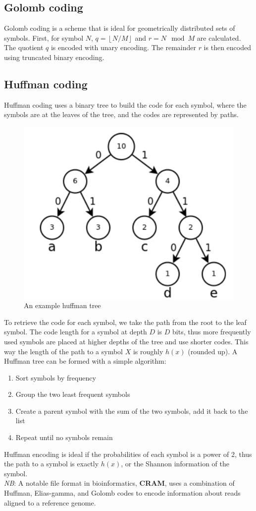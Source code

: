 \documentclass[12pt]{article}
\begin{document}
\subsection{Golomb coding}
Golomb coding is a scheme that is ideal for geometrically distributed sets of symbols. First, for symbol $N$, $q = \left \lfloor{N / M}\right \rfloor $ and $r = N \mod M$ are calculated. The quotient $q$ is encoded with unary encoding. The remainder $r$ is then encoded using truncated binary encoding.
\subsection{Huffman coding}
Huffman coding uses a binary tree to build the code for each symbol, where the symbols are at the leaves of the tree, and the codes are represented by paths.
\begin{figure}[h]
    \centering
    \includegraphics[width = .5\linewidth]{huffman.png}
    \caption{An example huffman tree}
    \label{fig:huffman}
\end{figure}
To retrieve the code for each symbol, we take the path from the root to the leaf symbol. The code length for a symbol at depth $D$ is $D$ bits, thus more frequently used symbols are placed at higher depths of the tree and use shorter codes. This way the length of the path to a symbol $X$ is roughly $h(x)$ (rounded up). A Huffman tree can be formed with a simple algorithm:
\begin{enumerate}
    \item Sort symbols by frequency
    \item Group the two least frequent symbols 
    \item Create a parent symbol with the sum of the two symbols, add it back to the list
    \item Repeat until no symbols remain
\end{enumerate}
Huffman encoding is ideal if the probabilities of each symbol is a power of 2, thus the path to a symbol is exactly $h(x)$, or the Shannon information of the symbol.\\[10pt]
\textit{NB}: A notable file format in bioinformatics, \textbf{CRAM}, uses a combination of Huffman, Elias-gamma, and Golomb codes to encode information about reads aligned to a reference genome.
\end{document}
